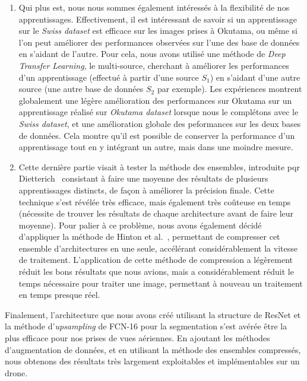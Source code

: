 \begin{enumerate}
\item Qui plus est, nous nous sommes également intéressés à la flexibilité de nos apprentissages. Effectivement, il est intéressant de savoir si un apprentissage sur le \textit{Swiss dataset} est efficace sur les images prises à Okutama, ou même si l'on peut améliorer des performances observées sur l'une des base de données en s'aidant de l'autre. Pour cela, nous avons utilisé une méthode de \textit{Deep Transfer Learning}, le multi-source, cherchant à améliorer les performances d'un apprentissage (effectué à partir d'une source $S_1$) en s'aidant d'une autre source (une autre base de données $S_2$ par exemple). Les expériences montrent globalement une légère amélioration des performances sur Okutama sur un apprentissage réalisé sur \textit{Okutama dataset} lorsque nous le complétons avec le \textit{Swiss dataset}, et une amélioration globale des peformances sur les deux bases de données. Cela montre qu'il est possible de conserver la performance d'un apprentissage tout en y intégrant un autre, mais dans une moindre mesure.
\item Cette dernière partie visait à tester la méthode des ensembles, introduite pqr Dietterich~\cite{DIET00} consistant à faire une moyenne des résultats de plusieurs apprentissages distincts, de façon à améliorer la précision finale. Cette technique s'est révélée très efficace, mais également très coûteuse en temps (nécessite de trouver les résultats de chaque architecture avant de faire leur moyenne). Pour palier à ce problème, nous avons également décidé d'appliquer la méthode de Hinton et al.~\cite{HINT15}, permettant de compresser cet ensemble d'architectures en une seule, accélérant considérablement la vitesse de traitement. L'application de cette méthode de compression a légèrement réduit les bons résultats que nous avions, mais a considérablement réduit le temps nécessaire pour traiter une image, permettant à nouveau un traitement en temps presque réel.
\end{enumerate}

Finalement, l'architecture que nous avons créé utilisant la structure de ResNet et la méthode d'\textit{upsampling} de FCN-16 pour la segmentation s'est avérée être la plus efficace pour nos prises de vues aériennes. En ajoutant les méthodes d'augmentation de données, et en utilisant la méthode des ensembles compressés, nous obtenons des résultats très largement exploitables et implémentables sur un drone.

